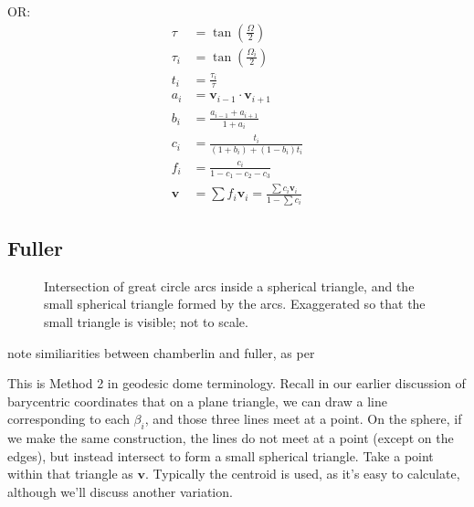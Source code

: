 \documentclass{amsart}[12pt]
\begin{document}
OR:
\begin{equation}\begin{split}
\tau   &= \tan\left(\frac{\Omega}{2}\right) \\
\tau_i &= \tan\left(\frac{\Omega_i}{2}\right) \\
t_i &= \frac{\tau_i}{\tau} \\
a_i &= \mathbf v_{i-1} \cdot \mathbf v_{i+1} \\
b_i &= \frac{a_{i-1} + a_{i+1}}{1 + a_i} \\
c_i &= \frac{t_i}{(1+b_i) + (1-b_i) t_i} \\
f_i &= \frac{c_i}{1 - c_1 - c_2 - c_3} \\
\mathbf v &= \sum f_i \mathbf v_i = \frac{\sum c_i \mathbf v_i }{ 1 - \sum c_i }
\end{split}\end{equation}

\subsection{Fuller}
\begin{figure}%
\caption{Intersection of great circle arcs inside a spherical triangle,
and the small spherical triangle formed by the arcs. Exaggerated so that the
small triangle is visible; not to scale.}
\label{fig:intlines}
\end{figure}
note similiarities between chamberlin and fuller, as per \cite{gray94}

This is Method 2 in geodesic dome terminology. Recall in our earlier discussion
of barycentric coordinates that on a plane triangle, we can draw a line
corresponding to each $\beta_i$, and those three lines meet at a point. On the
sphere, if we make the same construction, the lines do not meet at a point
(except on the edges), but instead intersect to form a small spherical
triangle. Take a point within that triangle as $\mathbf v$.
Typically the centroid is used, as it's easy to calculate,
although we'll discuss another variation.
\end{document}
